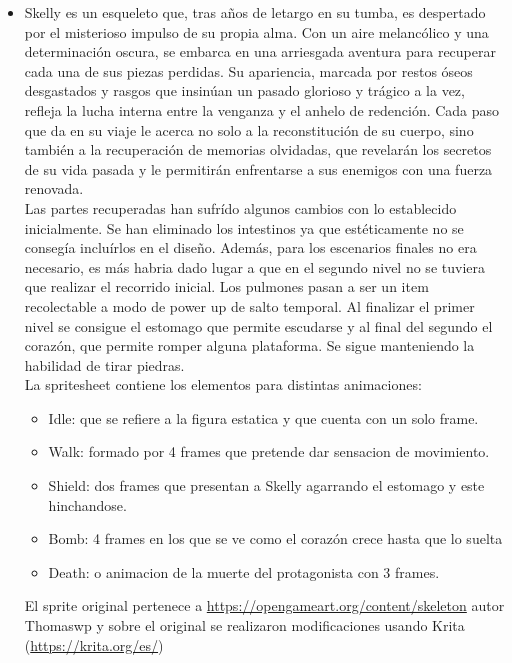 \documentclass[12pt,a4paper,twoside,spanish]{article}      %
\begin{document}
\begin{itemize}
    \item Skelly es un esqueleto que, tras años de letargo en su tumba, es despertado por el misterioso impulso de su propia alma. Con un aire melancólico y una determinación oscura, se embarca en una arriesgada aventura para recuperar cada una de sus piezas perdidas. Su apariencia, marcada por restos óseos desgastados y rasgos que insinúan un pasado glorioso y trágico a la vez, refleja la lucha interna entre la venganza y el anhelo de redención. Cada paso que da en su viaje le acerca no solo a la reconstitución de su cuerpo, sino también a la recuperación de memorias olvidadas, que revelarán los secretos de su vida pasada y le permitirán enfrentarse a sus enemigos con una fuerza renovada.\\
    Las partes recuperadas han sufrído algunos cambios con lo establecido inicialmente. Se han eliminado los intestinos ya que estéticamente no se consegía incluírlos en el diseño. Además, para los escenarios finales no era necesario, es más habria dado lugar a que en el segundo nivel no se tuviera que realizar el recorrido inicial. Los pulmones pasan a ser un item recolectable a modo de power up de salto temporal. Al finalizar el primer nivel se consigue el estomago que permite escudarse y al final del segundo el corazón, que permite romper alguna plataforma. Se sigue manteniendo la habilidad de tirar piedras.\\
    La spritesheet contiene los elementos para distintas animaciones:
    \begin{itemize}
        \item Idle: que se refiere a la figura estatica y que cuenta con un solo frame.
        \item Walk: formado por 4 frames que pretende dar sensacion de movimiento.
        \item Shield: dos frames que presentan a Skelly agarrando el estomago y este hinchandose.
       \item Bomb: 4 frames en los que se ve como el corazón crece hasta que lo suelta
        \item Death: o animacion de la muerte del protagonista con 3 frames.
    \end{itemize}
    El sprite original pertenece a \url{https://opengameart.org/content/skeleton} autor Thomaswp y sobre el original se realizaron modificaciones usando Krita (\url{https://krita.org/es/})\\

    \begin{center}
    \end{center}
    

\end{itemize}
\end{document}
